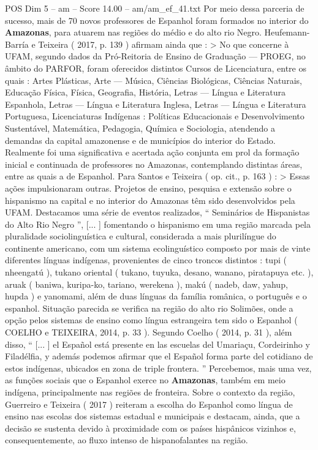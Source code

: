 \begin{textsample}{POS Dim 5 – am – Score 14.00 – am/am\_ef\_41.txt}
Por meio dessa parceria de sucesso, mais de 70 novos professores de Espanhol foram formados no interior do \textbf{Amazonas}, para atuarem nas regiões do médio e do alto rio Negro.
Heufemann-Barría e Teixeira ( 2017, p. 139 ) afirmam ainda que : > No que concerne à UFAM, segundo dados da Pró-Reitoria de Ensino de Graduação — PROEG, no âmbito do PARFOR, foram oferecidos distintos Cursos de Licenciatura, entre os quais : Artes Plásticas, Arte — Música, Ciências Biológicas, Ciências Naturais, Educação Física, Física, Geografia, História, Letras — Língua e Literatura Espanhola, Letras — Língua e Literatura Inglesa, Letras — Língua e Literatura Portuguesa, Licenciaturas Indígenas : Políticas Educacionais e Desenvolvimento Sustentável, Matemática, Pedagogia, Química e Sociologia, atendendo a demandas da capital amazonense e de municípios do interior do Estado.
Realmente foi uma significativa e acertada ação conjunta em prol da formação inicial e continuada de professores no Amazonas, contemplando distintas áreas, entre as quais a de Espanhol.
Para Santos e Teixeira ( op. cit., p. 163 ) : > Essas ações impulsionaram outras.
Projetos de ensino, pesquisa e extensão sobre o hispanismo na capital e no interior do Amazonas têm sido desenvolvidos pela UFAM.
Destacamos uma série de eventos realizados, “ Seminários de Hispanistas do Alto Rio Negro ”, [... ] fomentando o hispanismo em uma região marcada pela pluralidade sociolinguística e cultural, considerada a mais plurilíngue do continente americano, com um sistema ecolinguístico composto por mais de vinte diferentes línguas indígenas, provenientes de cinco troncos distintos : tupi ( nheengatú ), tukano oriental ( tukano, tuyuka, desano, wanano, piratapuya etc. ), aruak ( baniwa, kuripa-ko, tariano, werekena ), makú ( nadeb, daw, yahup, hupda ) e yanomami, além de duas línguas da família românica, o português e o espanhol.
Situação parecida se verifica na região do alto rio Solimões, onde a opção pelos sistemas de ensino como língua estrangeira tem sido o Espanhol ( COELHO e TEIXEIRA, 2014, p. 33 ).
Segundo Coelho ( 2014, p. 31 ), além disso, “ [... ] el Español está presente en las escuelas del Umariaçu, Cordeirinho y Filadélfia, y además podemos afirmar que el Español forma parte del cotidiano de estos indígenas, ubicados en zona de triple frontera. ” Percebemos, mais uma vez, as funções sociais que o Espanhol exerce no \textbf{Amazonas}, também em meio indígena, principalmente nas regiões de fronteira.
Sobre o contexto da região, Guerreiro e Teixeira ( 2017 ) reiteram a escolha do Espanhol como língua de ensino nas escolas dos sistemas estadual e municipais e destacam, ainda, que a decisão se sustenta devido à proximidade com os países hispânicos vizinhos e, consequentemente, ao fluxo intenso de hispanofalantes na região.

\end{textsample}
